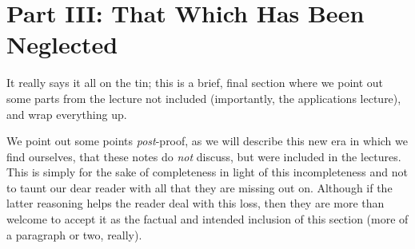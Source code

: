 % 
%
%

\section{Part III: That Which Has Been Neglected}

\noindent It really says it all on the tin; this is a brief, final section where we point out some parts from the lecture not included (importantly, the applications lecture), and wrap everything up.

We point out some points \emph{post}-proof, as we will describe this new era in which we find ourselves, that these notes do \emph{not} discuss, but were included in the lectures. This is simply for the sake of completeness in light of this incompleteness and not to taunt our dear reader with all that they are missing out on. Although if the latter reasoning helps the reader deal with this loss, then they are more than welcome to accept it as the factual and intended inclusion of this section (more of a paragraph or two, really).
